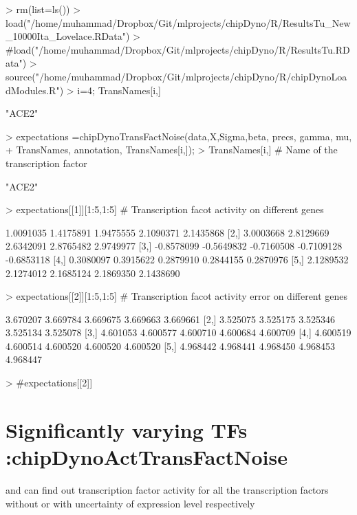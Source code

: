 \documentclass{article}
\begin{document}
\begin{Schunk}
\begin{Sinput}
> rm(list=ls())
> load("/home/muhammad/Dropbox/Git/mlprojects/chipDyno/R/ResultsTu_New_10000Ita_Lovelace.RData")
> #load("/home/muhammad/Dropbox/Git/mlprojects/chipDyno/R/ResultsTu.RData")
> source("/home/muhammad/Dropbox/Git/mlprojects/chipDyno/R/chipDynoLoadModules.R")
> i=4; TransNames[i,]
\end{Sinput}
\begin{Soutput}
[1] "ACE2"
\end{Soutput}
\begin{Sinput}
> expectations =chipDynoTransFactNoise(data,X,Sigma,beta, precs, gamma, mu,
+                                      TransNames, annotation, TransNames[i,]);
> TransNames[i,] # Name of the transcription factor
\end{Sinput}
\begin{Soutput}
[1] "ACE2"
\end{Soutput}
\begin{Sinput}
> expectations[[1]][1:5,1:5] # Transcription facot activity on different genes
\end{Sinput}
\begin{Soutput}
           [,1]       [,2]       [,3]       [,4]       [,5]
[1,]  1.0091035  1.4175891  1.9475555  2.1090371  2.1435868
[2,]  3.0003668  2.8129669  2.6342091  2.8765482  2.9749977
[3,] -0.8578099 -0.5649832 -0.7160508 -0.7109128 -0.6853118
[4,]  0.3080097  0.3915622  0.2879910  0.2844155  0.2870976
[5,]  2.1289532  2.1274012  2.1685124  2.1869350  2.1438690
\end{Soutput}
\begin{Sinput}
> expectations[[2]][1:5,1:5] # Transcription facot activity error on different genes
\end{Sinput}
\begin{Soutput}
         [,1]     [,2]     [,3]     [,4]     [,5]
[1,] 3.670207 3.669784 3.669675 3.669663 3.669661
[2,] 3.525075 3.525175 3.525346 3.525134 3.525078
[3,] 4.601053 4.600577 4.600710 4.600684 4.600709
[4,] 4.600519 4.600514 4.600520 4.600520 4.600520
[5,] 4.968442 4.968441 4.968450 4.968453 4.968447
\end{Soutput}
\begin{Sinput}
> #expectations[[2]]
\end{Sinput}
\end{Schunk}


\section{Significantly varying TFs :chipDynoActTransFactNoise}
 and  can find out transcription factor activity for all the transcription factors without or with uncertainty of expression level respectively 
\end{document}
